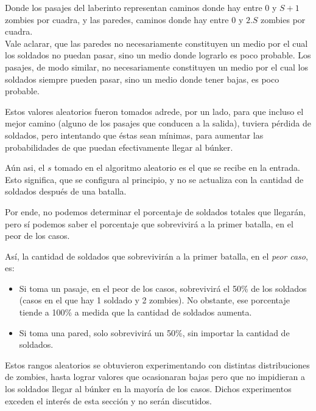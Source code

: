 Donde los pasajes del laberinto representan caminos donde hay entre $0$ y $S+1$ zombies por cuadra, y las paredes, caminos donde hay entre $0$ y $2.S$ zombies por cuadra.\\

Vale aclarar, que las paredes no necesariamente constituyen un medio por el cual los soldados no puedan pasar, sino un medio donde lograrlo es poco probable. Los pasajes, de modo similar, no necesariamente constituyen un medio por el cual los soldados siempre pueden pasar, sino un medio donde tener bajas, es poco probable.

Estos valores aleatorios fueron tomados adrede, por un lado, para que incluso el mejor camino (alguno de los pasajes que conducen a la salida), tuviera p\'erdida de soldados, pero intentando que éstas sean mínimas, para aumentar las probabilidades de que puedan efectivamente llegar al búnker.\\
\bigskip

Aún asi, el $s$ tomado en el algoritmo aleatorio es el que se recibe en la entrada. Esto significa, que se configura al principio, y no se actualiza con la cantidad de soldados despu\'es de una batalla.

Por ende, no podemos determinar el porcentaje de soldados totales que llegarán, pero sí podemos saber el porcentaje que sobrevivirá a la primer batalla, en el peor de los casos.

\newpage

Así, la cantidad de soldados que sobrevivir\'an a la primer batalla, en el \emph{peor caso}, es:

\begin{itemize}
	\item Si toma un pasaje, en el peor de los casos, sobrevivirá el 50\% de los soldados (casos en el que hay 1 soldado y 2 zombies). No obstante, ese porcentaje tiende a 100\% a medida que la cantidad de soldados aumenta.
	\item Si toma una pared, solo sobrevivirá un 50\%, sin importar la cantidad de soldados.
\end{itemize}

Estos rangos aleatorios se obtuvieron experimentando con distintas distribuciones de zombies, hasta lograr valores que ocasionaran bajas pero que no impidieran a los soldados llegar al búnker en la mayoría de los casos. Dichos experimentos exceden el interés de esta sección y no serán discutidos.\\
\\
\bigskip

